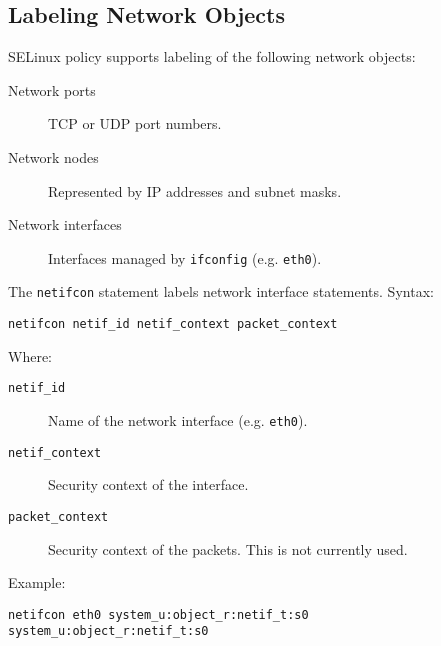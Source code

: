 \subsection{Labeling Network Objects}

SELinux policy supports labeling of the following network objects:
\begin{description}
    \item [Network ports] TCP or UDP port numbers.
    \item [Network nodes] Represented by IP addresses and subnet masks.
    \item [Network interfaces] Interfaces managed by \texttt{ifconfig} (e.g.
        \texttt{eth0}).
\end{description}

The \texttt{netifcon} statement labels network interface statements. Syntax:
\begin{lstlisting}
netifcon netif_id netif_context packet_context
\end{lstlisting}
Where:
\begin{description}
    \item [\texttt{netif\_id}] Name of the network interface (e.g.
        \texttt{eth0}).
    \item [\texttt{netif\_context}] Security context of the interface.
    \item [\texttt{packet\_context}] Security context of the packets. This is
        not currently used.
\end{description}
Example:
\begin{lstlisting}
netifcon eth0 system_u:object_r:netif_t:s0 system_u:object_r:netif_t:s0
\end{lstlisting}

